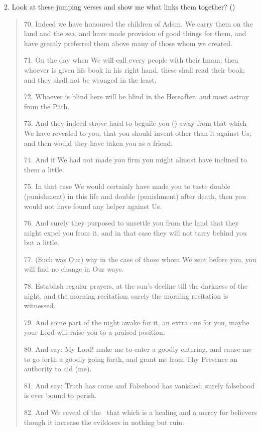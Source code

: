 \documentclass[12pt]{memoir}
\begin{document}
2. Look at these jumping verses and show me what links them together?
()

\begin{quote}
70. Indeed we have honoured the children of Adam.
We carry them on the land and the sea,
and have made provision of good things for them,
and have greatly preferred them above many of those whom we created.

71. On the day when We will call every people with their Imam;
then whoever is given his book in his right hand, these shall read their book;
and they shall not be wronged in the least.

72. Whoever is blind here will be blind in the Hereafter,
and most astray from the Path.

73. And they indeed strove hard to beguile you
()
away from that which We have revealed to you,
that you should invent other than it against Us;
and then would they have taken you as a friend.

74. And if We had not made you firm
you might almost have inclined to them a little.

75. In that case We would certainly have made you to taste
double (punishment) in this life and double (punishment) after death,
then you would not have found any helper against Us.

76. And surely they purposed to unsettle you from the land
that they might expel you from it,
and in that case they will not tarry behind you but a little.

77. (Such was Our) way in the case of those whom We sent before you,
you will find no change in Our ways.

78. Establish regular prayers,
at the sun’s decline till the darkness of the night,
and the morning recitation; surely the morning recitation is witnessed.

79. And some part of the night awake for it, an extra one for you,
maybe your Lord will raise you to a praised position.

80. And say: My Lord! make me to enter a goodly entering,
and cause me to go forth a goodly going forth,
and grant me from Thy Presence an authority to aid (me).

81. And say: Truth has come and Falsehood has vanished;
surely falsehood is ever bound to perish.

82. And We reveal of the \Quran\ that which is a healing
and a mercy for believers though it increase the evil\–doers
in nothing but ruin.


\end{quote}
\end{document}
